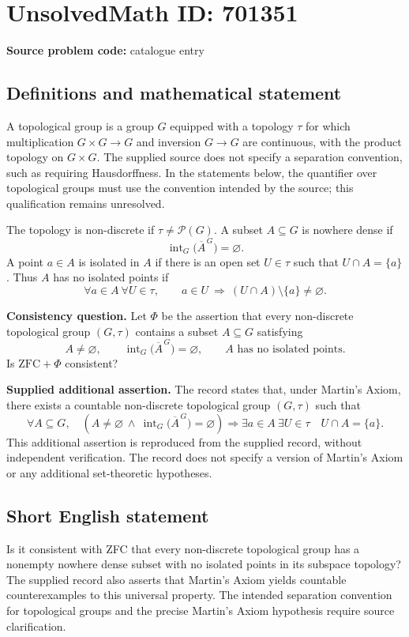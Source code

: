 \documentclass[11pt]{article}
\begin{document}
\section*{UnsolvedMath ID: 701351}
\textbf{Source problem code:} catalogue entry
\subsection{Definitions and mathematical statement}
A topological group is a group \(G\) equipped with a topology \(\tau\) for which multiplication \(G\times G\to G\) and inversion \(G\to G\) are continuous, with the product topology on \(G\times G\). The supplied source does not specify a separation convention, such as requiring Hausdorffness. In the statements below, the quantifier over topological groups must use the convention intended by the source; this qualification remains unresolved.

The topology is non-discrete if \(\tau\ne\mathcal P(G)\). A subset \(A\subseteq G\) is nowhere dense if
\[
\operatorname{int}_G\bigl(\overline A^{\,G}\bigr)=\varnothing.
\]
A point \(a\in A\) is isolated in \(A\) if there is an open set \(U\in\tau\) such that \(U\cap A=\{a\}\). Thus \(A\) has no isolated points if
\[
\forall a\in A\ \forall U\in\tau,\qquad
 a\in U\ \Longrightarrow\ (U\cap A)\setminus\{a\}\ne\varnothing.
\]

\textbf{Consistency question.} Let \(\Phi\) be the assertion that every non-discrete topological group \((G,\tau)\) contains a subset \(A\subseteq G\) satisfying
\[
A\ne\varnothing,\qquad
\operatorname{int}_G\bigl(\overline A^{\,G}\bigr)=\varnothing,
\qquad A\text{ has no isolated points}.
\]
Is \(\mathrm{ZFC}+\Phi\) consistent?

\textbf{Supplied additional assertion.} The record states that, under Martin's Axiom, there exists a countable non-discrete topological group \((G,\tau)\) such that
\[
\forall A\subseteq G,\quad
\left(A\ne\varnothing\ \land\
\operatorname{int}_G\bigl(\overline A^{\,G}\bigr)=\varnothing\right)
\Longrightarrow
\exists a\in A\ \exists U\in\tau\quad U\cap A=\{a\}.
\]
This additional assertion is reproduced from the supplied record, without independent verification. The record does not specify a version of Martin's Axiom or any additional set-theoretic hypotheses.
\subsection{Short English statement}
Is it consistent with ZFC that every non-discrete topological group has a nonempty nowhere dense subset with no isolated points in its subspace topology? The supplied record also asserts that Martin's Axiom yields countable counterexamples to this universal property. The intended separation convention for topological groups and the precise Martin's Axiom hypothesis require source clarification.
\end{document}
